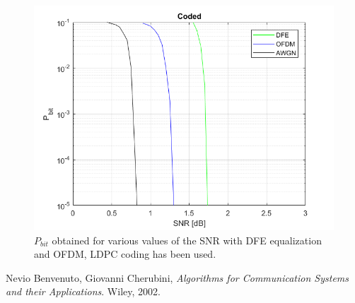\documentclass[a4paper,11.5pt]{article}
\begin{document}
\begin{figure}[H]
	\begin{center}   
		\includegraphics[width=\textwidth]{figs/Pbit_coded.png} 
		\caption{$P_{bit}$ obtained for various values of the SNR with DFE equalization and OFDM, LDPC coding has been used.}
		\label{fig:Pbit_coded}
	\end{center}
\end{figure}
 
\begin{thebibliography}{15}	
	Nevio Benvenuto, Giovanni Cherubini,
	\textit{Algorithms for Communication Systems and their Applications}. 
	Wiley, 2002.
\end{thebibliography}
\end{document}

